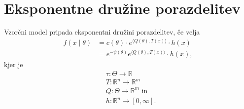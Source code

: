 \documentclass[a4paper, 12pt]{book}
\theoremstyle{definition}
\theoremstyle{remark}
\newcommand{\R}{\mathbb{R}}
\begin{document}
\section{Eksponentne družine porazdelitev}

Vzorčni model pripada eksponentni družini porazdelitev, če velja
\begin{align}
  f(x \mid \theta) &= c(\theta) \cdot e^{\langle Q(\theta), T(x)\rangle} \cdot h(x) \nonumber \\
  &= e^{-\psi(\theta)} e^{\langle Q(\theta), T(x)\rangle} \cdot h(x), \label{eksponentna-osnova}
\end{align}
kjer je
\begin{align*}
  &\tau: \Theta \to \R \\
  &T: \R^n \to \R^m \\
  &Q: \Theta \to \R^m \text{ in} \\
  &h: \R^n \to [0, \infty].
\end{align*}
\end{document}
